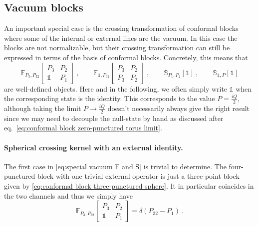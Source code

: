 \documentclass[12pt,a4paper]{article}
\newcommand{\be}{\begin{equation}}
\newcommand{\ee}{\end{equation}}
\newcommand\id{\mathds{1}}
\begin{document}
\subsection{Vacuum blocks} \label{subsec:vacuum blocks}
An important special case is the crossing transformation of conformal blocks where some of the internal or external lines are the vacuum. In this case the blocks are not normalizable, but their crossing transformation can still be expressed in terms of the basis of conformal blocks. Concretely, this means that
\be 
\mathbb{F}_{P_3,P_{32}}\!\begin{bmatrix}
    P_3 & P_2 \\ \id & P_1
\end{bmatrix}\ , \qquad \mathbb{F}_{\id,P_{32}}\!\begin{bmatrix}
    P_3 & P_2 \\
    P_3 & P_2
\end{bmatrix}\ , \qquad 
\mathbb{S}_{P_1,P_2}[\id]\ , \qquad
\mathbb{S}_{\id,P}[\id] \label{eq:special vacuum F and S}
\ee
are well-defined objects. Here and in the following, we often simply write $\id$ when the corresponding state is the identity. This corresponds to the value $P=\frac{iQ}{2}$, although taking the limit $P \to \frac{iQ}{2}$ doesn't necessarily always give the right result since we may need to decouple the null-state by hand as discussed after eq.~\eqref{eq:conformal block zero-punctured torus limit}.
\paragraph{Spherical crossing kernel with an external identity.}
The first case in \eqref{eq:special vacuum F and S} is trivial to determine. The four-punctured block with one trivial external operator is just a three-point block given by \eqref{eq:conformal block three-punctured sphere}. It in particular coincides in the two channels and thus we simply have
\be 
\mathbb{F}_{P_3,P_{32}}\!\begin{bmatrix}
    P_3 & P_2 \\ \id & P_1
\end{bmatrix}=\delta(P_{32}-P_1)\ . \label{eq:F symbol identity delta function}
\ee
\end{document}
